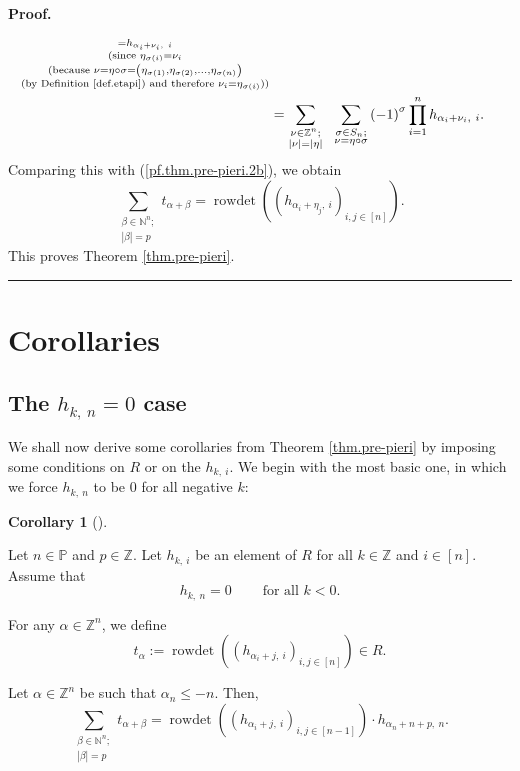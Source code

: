 \documentclass
[numbers=enddot,12pt,final,onecolumn,notitlepage,english]{scrartcl}%
\theoremstyle{definition}
\newtheorem{coro}[theo]{Corollary}
\newenvironment{corollary}[1][]
{\begin{coro}[#1]\begin{leftbar}}
{\end{leftbar}\end{coro}}
\newenvironment{proof}[1][Proof]{\noindent\textbf{#1.} }{\ \rule{0.5em}{0.5em}}
\let\sumnonlimits\sum
\let\prodnonlimits\prod
\renewcommand{\sum}{\sumnonlimits\limits}
\renewcommand{\prod}{\prodnonlimits\limits}
\newenvironment{verlong}{}{}
\begin{document}
\begin{verlong}
\begin{proof}
\begin{align*}
_{\substack{=h_{\alpha_{i}+\nu_{i},\ i}\\\text{(since }\eta_{\sigma\left(
i\right)  }=\nu_{i}\\\text{(because }\nu=\eta\circ\sigma=\left(  \eta
_{\sigma\left(  1\right)  },\eta_{\sigma\left(  2\right)  },\ldots
,\eta_{\sigma\left(  n\right)  }\right)  \\\text{(by Definition
\ref{def.etapi}) and therefore }\nu_{i}=\eta_{\sigma\left(  i\right)
}\text{))}}}\\
&  =\sum_{\substack{\nu\in\mathbb{Z}^{n};\\\left\vert \nu\right\vert
=\left\vert \eta\right\vert }}\ \ \sum_{\substack{\sigma\in S_{n};\\\nu
=\eta\circ\sigma}}\left(  -1\right)  ^{\sigma}\prod_{i=1}^{n}h_{\alpha_{i}%
+\nu_{i},\ i}.
\end{align*}
Comparing this with (\ref{pf.thm.pre-pieri.2b}), we obtain%
\[
\sum_{\substack{\beta\in\mathbb{N}^{n};\\\left\vert \beta\right\vert
=p}}t_{\alpha+\beta}=\operatorname*{rowdet}\left(  \left(  h_{\alpha_{i}%
+\eta_{j},\ i}\right)  _{i,j\in\left[  n\right]  }\right)  .
\]
This proves Theorem \ref{thm.pre-pieri}.
\end{proof}
\end{verlong}

\section{Corollaries}

\subsection{The $h_{k,\ n}=0$ case}

We shall now derive some corollaries from Theorem \ref{thm.pre-pieri} by
imposing some conditions on $R$ or on the $h_{k,\ i}$. We begin with the most
basic one, in which we force $h_{k,\ n}$ to be $0$ for all negative $k$:

\begin{corollary}
\label{cor.pre-pieri.2}Let $n\in\mathbb{P}$ and $p\in\mathbb{Z}$. Let
$h_{k,\ i}$ be an element of $R$ for all $k\in\mathbb{Z}$ and $i\in\left[
n\right]  $. Assume that%
\begin{equation}
h_{k,\ n}=0\ \ \ \ \ \ \ \ \ \ \text{for all }k<0.
\label{eq.cor.pre-pieri.2.ass0}%
\end{equation}


For any $\alpha\in\mathbb{Z}^{n}$, we define%
\[
t_{\alpha}:=\operatorname*{rowdet}\left(  \left(  h_{\alpha_{i}+j,\ i}\right)
_{i,j\in\left[  n\right]  }\right)  \in R.
\]


Let $\alpha\in\mathbb{Z}^{n}$ be such that $\alpha_{n}\leq-n$. Then,%
\[
\sum_{\substack{\beta\in\mathbb{N}^{n};\\\left\vert \beta\right\vert
=p}}t_{\alpha+\beta}=\operatorname*{rowdet}\left(  \left(  h_{\alpha
_{i}+j,\ i}\right)  _{i,j\in\left[  n-1\right]  }\right)  \cdot h_{\alpha
_{n}+n+p,\ n}.
\]

\end{corollary}
\end{document}
